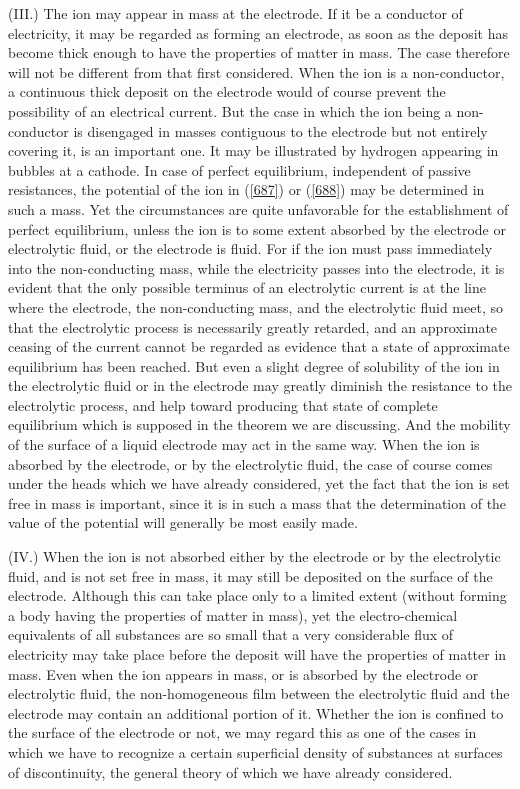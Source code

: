 \documentclass[12pt]{article}
\begin{document}
(III.) The ion may appear in mass at the electrode. If it be a conductor of electricity, it may be regarded as forming an electrode, as soon as the deposit has become thick enough to have the properties of matter in mass. The case therefore will not be different from that first considered. When the ion is a non-conductor, a continuous thick deposit on the electrode would of course prevent the possibility of an electrical current. But the case in which the ion being a non-conductor is disengaged in masses contiguous to the electrode but not entirely covering it, is an important one. It may be illustrated by hydrogen appearing in bubbles at a cathode. In case of perfect equilibrium, independent of passive resistances, the potential of the ion in (\ref{687}) or (\ref{688}) may be determined in such a mass. Yet the circumstances are quite unfavorable for the establishment of perfect equilibrium, unless the ion is to some extent absorbed by the electrode or electrolytic fluid, or the electrode is fluid. For if the ion must pass immediately into the non-conducting mass, while the electricity passes into the electrode, it is evident that the only possible terminus of an electrolytic current is at the line where the electrode, the non-conducting mass, and the electrolytic fluid meet, so that the electrolytic process is necessarily greatly retarded, and an approximate ceasing of the current cannot be regarded as evidence that a state of approximate equilibrium has been reached. But even a slight degree of solubility of the ion in the electrolytic fluid or in the electrode may greatly diminish the resistance to the electrolytic process, and help toward producing that state of complete equilibrium which is supposed in the theorem we are discussing. And the mobility of the surface of a liquid electrode may act in the same way. When the ion is absorbed by the electrode, or by the electrolytic fluid, the case of course comes under the heads which we have already considered, yet the fact that the ion is set free in mass is important, since it is in such a mass that the determination of the value of the potential will generally be most easily made.

(IV.) When the ion is not absorbed either by the electrode or by the electrolytic fluid, and is not set free in mass, it may still be deposited on the surface of the electrode. Although this can take place only to a limited extent (without forming a body having the properties of matter in mass), yet the electro-chemical equivalents of all substances are so small that a very considerable flux of electricity may take place before the deposit will have the properties of matter in mass. Even when the ion appears in mass, or is absorbed by the electrode or electrolytic fluid, the non-homogeneous film between the electrolytic fluid and the electrode may contain an additional portion of it. Whether the ion is confined to the surface of the electrode or not, we may regard this as one of the cases in which we have to recognize a certain superficial density of substances at surfaces of discontinuity, the general theory of which we have already considered. 
\end{document}
